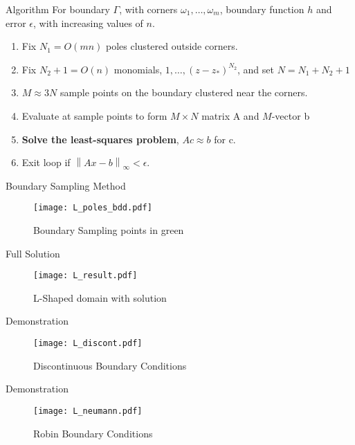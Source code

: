 \documentclass[envcountsect notes]{beamer}       %
\newcommand{\norm}[1]{\left\lVert#1\right\rVert}
\begin{document}
\begin{frame}{Algorithm}
    For boundary $\Gamma$, with corners $\omega_1, \dots, \omega_m$, boundary function 
    $h$ and error $\epsilon$, with increasing values of $n$. 
    \begin{enumerate}
        \item Fix $N_1=O(mn)$ poles clustered outside corners.
        \item Fix $N_2+1=O(n)$ monomials, $1, \dots, (z-z_*)^{N_2}$, and set $N = N_1 + N_2 + 1$
        \item $M \approx 3N$ sample points on the boundary clustered near the corners.
        \item Evaluate at sample points to form $M \times N$ matrix A and $M$-vector b
        \item \textbf{Solve the least-squares problem}, $Ac \approx b$ for c.
        \item Exit loop if $\norm{Ax - b}_\infty < \epsilon$.
    \end{enumerate}
\end{frame}

\begin{frame}{Boundary Sampling Method}
    \begin{figure}[t]
        \texttt{[image: L\_poles\_bdd.pdf]}
        \vspace{-3em}
        \caption*{Boundary Sampling points in green}
    \end{figure}
\end{frame}

\begin{frame}{Full Solution}
    \begin{figure}[t]
        \texttt{[image: L\_result.pdf]}
        \vspace{-3em}
        \caption*{L-Shaped domain with solution}
    \end{figure}
\end{frame}

\begin{frame}{Demonstration}
    \begin{figure}[t]
        \texttt{[image: L\_discont.pdf]}
        \vspace{-3em}
        \caption*{Discontinuous Boundary Conditions}
    \end{figure}
\end{frame}

\begin{frame}{Demonstration}
    \begin{figure}[t]
        \texttt{[image: L\_neumann.pdf]}
        \vspace{-3em}
        \caption*{Robin Boundary Conditions}
    \end{figure}
\end{frame}
\end{document}
